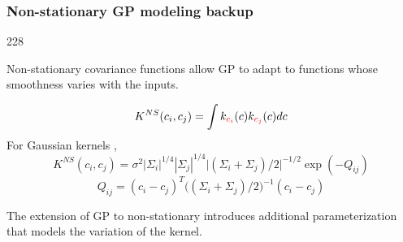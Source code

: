 \documentclass{beamer}
\let\oldcite=\cite
\renewcommand{\cite}[1]{\textcolor[rgb]{.4,.4,.85}{\oldcite{#1}}}
\newcommand{\barrow}{\item[\color{darkred}\ding{228}]}
\begin{document}

\begin{frame}
    \frametitle{Non-stationary GP modeling \hfill \scriptsize{backup}}\small
    \begin{dinglist}{228}
    \barrow
    Non-stationary covariance functions allow GP to adapt to functions whose smoothness
    varies with the inputs.
    \barrow
    $$
        K^{NS}(c_i, c_j) = \int k_{\textcolor{red}{c_i}}(c) k_{\textcolor{red}{c_j}}(c) dc
    $$
    For Gaussian kernels \scriptsize\cite{Higdon 99} \small, 
    $$
        K^{NS}(c_i, c_j) = \sigma^2 |\Sigma_i|^{1/4} |\Sigma_j|^{1/4} \big|\left( 
        \Sigma_i + \Sigma_j
        \right)/2\big|^{- 1/2} \exp(-Q_{ij})
    $$
    $$
        Q_{ij} = (c_i - c_j)^T \big((\Sigma_i + \Sigma_j)/2\big)^{-1}(c_i-c_j)
    $$
    \barrow
    The extension of GP to non-stationary introduces additional parameterization that
    models the variation of the kernel. 
    \end{dinglist}
\end{frame}
\end{document}
